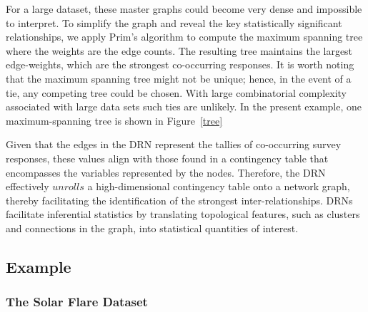 For a large dataset, these master graphs could become very dense and impossible to interpret. To simplify the graph and reveal the key statistically significant relationships, we apply Prim’s algorithm to compute the maximum spanning tree where the weights are the edge counts. The resulting tree maintains the largest edge-weights, which are the strongest co-occurring responses. It is worth noting that the maximum spanning tree might not be unique; hence, in the event of a tie, any competing tree could be chosen. With large combinatorial complexity associated with large data sets such ties are unlikely. In the present example, one maximum-spanning tree is shown in Figure~\ref{tree}

Given that the edges in the DRN represent the tallies of co-occurring survey responses, these values align with those found in a contingency table that encompasses the variables represented by the nodes. Therefore, the DRN effectively $unrolls$ a high-dimensional contingency table onto a network graph, thereby facilitating the identification of the strongest inter-relationships. DRNs facilitate inferential statistics by translating topological features, such as clusters and connections in the graph, into statistical quantities of interest.

\subsection{Example\label{Example}}
\subsubsection{The Solar Flare Dataset \label{Solar}}

